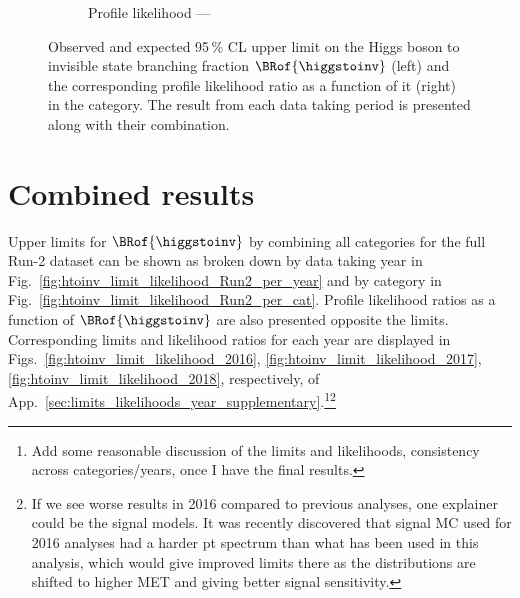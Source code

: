 \begin{figure}[htbp]
\begin{subfigure}[t]{0.45\textwidth}
        \caption{Profile likelihood --- \ggH}
    \end{subfigure}
    \caption[Observed and expected 95\,\% CL upper limit on the Higgs boson to invisible state branching fraction $\BRof{\higgstoinv}$ (left) and the corresponding profile likelihood ratio as a function of it (right) in the \ggH category]{Observed and expected 95\,\% CL upper limit on the Higgs boson to invisible state branching fraction $\BRof{\higgstoinv}$ (left) and the corresponding profile likelihood ratio as a function of it (right) in the \ggH category. The result from each data taking period is presented along with their combination.}
    \label{fig:htoinv_limit_ggF}
\end{figure}

\clearpage




\section{Combined results}
\label{sec:htoinv_combined_results}


Upper limits for $\BRof{\higgstoinv}$ by combining all categories for the full Run-2 dataset can be shown as broken down by data taking year in Fig.~\ref{fig:htoinv_limit_likelihood_Run2_per_year} and by category in Fig.~\ref{fig:htoinv_limit_likelihood_Run2_per_cat}. Profile likelihood ratios as a function of $\BRof{\higgstoinv}$ are also presented opposite the limits. Corresponding limits and likelihood ratios for each year are displayed in Figs.~\ref{fig:htoinv_limit_likelihood_2016}, \ref{fig:htoinv_limit_likelihood_2017}, \ref{fig:htoinv_limit_likelihood_2018}, respectively, of App.~\ref{sec:limits_likelihoods_year_supplementary}.\footnote{Add some reasonable discussion of the limits and likelihoods, consistency across categories/years, once I have the final results.}\footnote{If we see worse results in 2016 compared to previous analyses, one explainer could be the signal models. It was recently discovered that signal MC used for 2016 analyses had a harder pt spectrum than what has been used in this analysis, which would give improved limits there as the distributions are shifted to higher MET and giving better signal sensitivity.}

